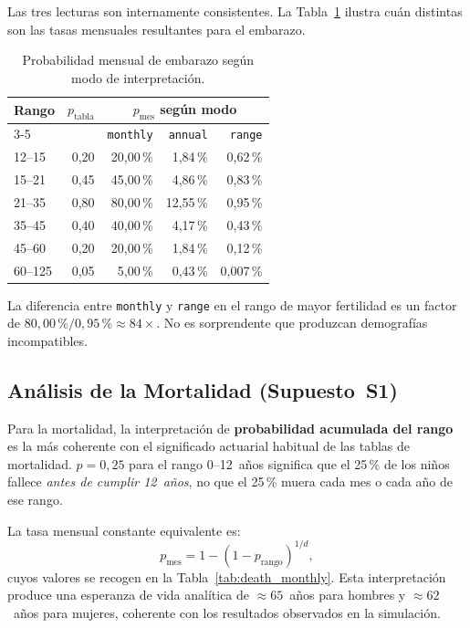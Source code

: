 \documentclass{llncs}
\begin{document}
Las tres lecturas son internamente consistentes.
La Tabla~\ref{tab:pregnancy_modes} ilustra cuán distintas son las tasas
mensuales resultantes para el embarazo.

\begin{table}[H]
\caption{Probabilidad mensual de embarazo según modo de interpretación.}
\label{tab:pregnancy_modes}
\centering
\small
\begin{tabular}{lrrrr}
\toprule
\textbf{Rango} & \textbf{$p_{\text{tabla}}$} &
\multicolumn{3}{c}{\textbf{$p_{\text{mes}}$ según modo}} \\
\cmidrule(lr){3-5}
 & & \texttt{monthly} & \texttt{annual} & \texttt{range} \\
\midrule
12--15  & 0{,}20 & 20{,}00\,\% &  1{,}84\,\% & 0{,}62\,\% \\
15--21  & 0{,}45 & 45{,}00\,\% &  4{,}86\,\% & 0{,}83\,\% \\
21--35  & 0{,}80 & 80{,}00\,\% & 12{,}55\,\% & 0{,}95\,\% \\
35--45  & 0{,}40 & 40{,}00\,\% &  4{,}17\,\% & 0{,}43\,\% \\
45--60  & 0{,}20 & 20{,}00\,\% &  1{,}84\,\% & 0{,}12\,\% \\
60--125 & 0{,}05 &  5{,}00\,\% &  0{,}43\,\% & 0{,}007\,\% \\
\bottomrule
\end{tabular}
\end{table}

La diferencia entre \texttt{monthly} y \texttt{range} en el rango de mayor
fertilidad es un factor de $80{,}00\,\% / 0{,}95\,\% \approx 84\times$.
No es sorprendente que produzcan demografías incompatibles.

\subsection{Análisis de la Mortalidad (Supuesto~S1)}

Para la mortalidad, la interpretación de \textbf{probabilidad acumulada del
rango} es la más coherente con el significado actuarial habitual de las
tablas de mortalidad.
$p = 0{,}25$ para el rango 0--12~años significa que el 25\,\% de los niños
fallece \emph{antes de cumplir 12~años}, no que el 25\,\% muera cada mes
o cada año de ese rango.

La tasa mensual constante equivalente es:
\[
  p_{\text{mes}} = 1 - (1-p_{\text{rango}})^{1/d},
\]
cuyos valores se recogen en la Tabla~\ref{tab:death_monthly}.
Esta interpretación produce una esperanza de vida analítica de
$\approx 65$~años para hombres y $\approx 62$~años para mujeres, coherente
con los resultados observados en la simulación.
\end{document}

